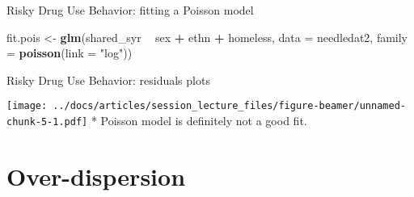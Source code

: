 \documentclass[
  ignorenonframetext,
]{beamer}
\newenvironment{Shaded}{\begin{snugshade}}{\end{snugshade}}
\newcommand{\DataTypeTok}[1]{\textcolor[rgb]{0.13,0.29,0.53}{#1}}
\newcommand{\KeywordTok}[1]{\textcolor[rgb]{0.13,0.29,0.53}{\textbf{#1}}}
\newcommand{\NormalTok}[1]{#1}
\newcommand{\OperatorTok}[1]{\textcolor[rgb]{0.81,0.36,0.00}{\textbf{#1}}}
\newcommand{\StringTok}[1]{\textcolor[rgb]{0.31,0.60,0.02}{#1}}
\begin{document}
\begin{frame}[fragile]{Risky Drug Use Behavior: fitting a Poisson model}
\protect\hypertarget{risky-drug-use-behavior-fitting-a-poisson-model}{}

\begin{Shaded}
\begin{Highlighting}[]
\NormalTok{fit.pois <-}\StringTok{ }\KeywordTok{glm}\NormalTok{(shared_syr }\OperatorTok{~}\StringTok{ }\NormalTok{sex }\OperatorTok{+}\StringTok{ }\NormalTok{ethn }\OperatorTok{+}\StringTok{ }\NormalTok{homeless,}
                \DataTypeTok{data =}\NormalTok{ needledat2,}
                \DataTypeTok{family =} \KeywordTok{poisson}\NormalTok{(}\DataTypeTok{link =} \StringTok{"log"}\NormalTok{))}
\end{Highlighting}
\end{Shaded}

\end{frame}

\begin{frame}{Risky Drug Use Behavior: residuals plots}
\protect\hypertarget{risky-drug-use-behavior-residuals-plots}{}

\texttt{[image: ../docs/articles/session\_lecture\_files/figure-beamer/unnamed-chunk-5-1.pdf]}
* Poisson model is definitely not a good fit.

\end{frame}

\hypertarget{over-dispersion}{%
\section{Over-dispersion}\label{over-dispersion}}
\end{document}
